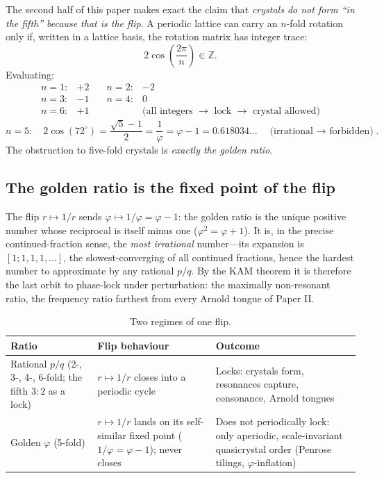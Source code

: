 \documentclass[11pt]{article}
\theoremstyle{remark}
\begin{document}
The second half of this paper makes exact the claim that \emph{crystals do not form ``in the fifth'' because that is the flip}. A periodic lattice can carry an $n$-fold rotation only if, written in a lattice basis, the rotation matrix has integer trace:
\begin{equation}
2\cos\!\left(\frac{2\pi}{n}\right) \in \mathbb{Z}.
\label{eq:restriction}
\end{equation}
Evaluating:
\begin{equation}
\begin{array}{llll}
n = 1: & +2 \quad & n = 2: & -2 \\
n = 3: & -1 & n = 4: & 0 \\
n = 6: & +1 & & \text{(all integers $\to$ lock $\to$ crystal allowed)}
\end{array}
\end{equation}
\begin{equation}
n = 5: \quad 2\cos(72^\circ) = \frac{\sqrt{5} - 1}{2} = \frac{1}{\varphi} = \varphi - 1 = 0.618034\ldots \quad \text{(irrational $\to$ forbidden)}.
\label{eq:five}
\end{equation}
The obstruction to five-fold crystals is \emph{exactly the golden ratio}.

\subsection{The golden ratio is the fixed point of the flip}

The flip $r \mapsto 1/r$ sends $\varphi \mapsto 1/\varphi = \varphi - 1$: the golden ratio is the unique positive number whose reciprocal is itself minus one ($\varphi^2 = \varphi + 1$). It is, in the precise continued-fraction sense, the \emph{most irrational} number---its expansion is $[1; 1, 1, 1, \ldots]$, the slowest-converging of all continued fractions, hence the hardest number to approximate by any rational $p/q$. By the KAM theorem it is therefore the last orbit to phase-lock under perturbation: the maximally non-resonant ratio, the frequency ratio farthest from every Arnold tongue of Paper II.

\begin{table}[ht]
\centering
\caption{Two regimes of one flip.}
\label{tab:regimes}
\begin{tabularx}{\textwidth}{@{}p{4.0cm}XX@{}}
\toprule
Ratio & Flip behaviour & Outcome \\
\midrule
Rational $p/q$ (2-, 3-, 4-, 6-fold; the fifth $3{:}2$ as a lock) & $r \mapsto 1/r$ closes into a periodic cycle & Locks: crystals form, resonances capture, consonance, Arnold tongues \\
\addlinespace
Golden $\varphi$ (5-fold) & $r \mapsto 1/r$ lands on its self-similar fixed point ($1/\varphi = \varphi - 1$); never closes & Does not periodically lock: only aperiodic, scale-invariant quasicrystal order (Penrose tilings, $\varphi$-inflation) \\
\bottomrule
\end{tabularx}
\end{table}
\end{document}
